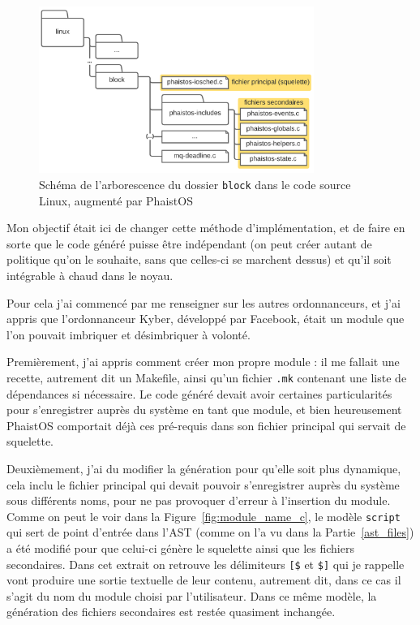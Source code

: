 \begin{figure}[h!t] \centering
    \includegraphics[width=0.8\textwidth]{images/linux_arch}
    \caption{Schéma de l'arborescence du dossier \texttt{block} dans le code 
    source Linux, augmenté par PhaistOS}
    \label{fig:modules_folder}
\end{figure}

Mon objectif était ici de changer cette méthode d'implémentation, et de faire 
en sorte que le code généré puisse être indépendant (on peut créer autant de 
politique qu'on le souhaite, sans que celles-ci se marchent dessus) et qu'il 
soit intégrable à chaud dans le noyau.

Pour cela j'ai commencé par me renseigner sur les autres ordonnanceurs, et j'ai 
appris que l'ordonnanceur Kyber, développé par Facebook, était un module que 
l'on pouvait imbriquer et désimbriquer à volonté. 

Premièrement, j'ai appris comment créer mon propre module : il me fallait 
une recette, autrement dit un Makefile, ainsi qu'un fichier \texttt{.mk} 
contenant une liste de dépendances si nécessaire. Le code généré devait avoir 
certaines particularités pour s'enregistrer auprès du système en tant que 
module, et bien heureusement PhaistOS comportait déjà ces pré-requis dans son 
fichier principal qui servait de squelette.

Deuxièmement, j'ai du modifier la génération pour qu'elle soit plus dynamique, 
cela inclu le fichier principal qui devait pouvoir s'enregistrer auprès du 
système sous différents noms, pour ne pas provoquer d'erreur à l'insertion du 
module. Comme on peut le voir dans la Figure~\ref{fig:module_name_c}, le modèle 
\texttt{script} qui sert de point d'entrée dans l'AST (comme on l'a vu dans la 
Partie~\ref{ast_files}) a été modifié pour que celui-ci génère le squelette 
ainsi que les fichiers secondaires. Dans cet extrait on retrouve les 
délimiteurs \texttt{[\$} et \texttt{\$]} qui je rappelle vont produire une 
sortie textuelle de leur contenu, autrement dit, dans ce cas il s'agit du nom 
du module choisi par l'utilisateur. Dans ce même modèle, la génération des 
fichiers secondaires est restée quasiment inchangée.

